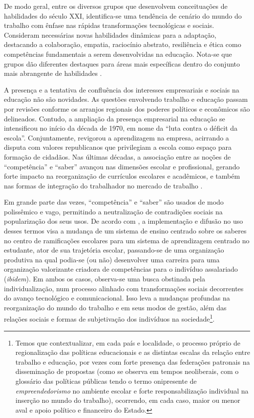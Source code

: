 \documentclass[portuguese]{textolivre}
\begin{document}
De modo geral, entre os diversos grupos que desenvolvem conceituações de
habilidades do século XXI, identifica-se uma tendência de cenário do
mundo do trabalho com ênfase nas rápidas transformações tecnológicas e
sociais. Consideram necessárias novas habilidades dinâmicas para a
adaptação, destacando a colaboração, empatia, raciocínio abstrato,
resiliência e ética como competências fundamentais a serem desenvolvidas
na educação. Nota-se que grupos dão diferentes destaques para áreas mais
específicas dentro do conjunto mais abrangente de habilidades
\cite{Dede2009}.

A presença e a tentativa de confluência dos interesses empresariais e
sociais na educação não são novidades. As questões envolvendo trabalho e
educação passam por revisões conforme os arranjos regionais dos poderes
políticos e econômicos são delineados. Contudo, a ampliação da presença
empresarial na educação se intensificou no início da década de 1970, em
nome da ``luta contra o déficit da escola''. Conjuntamente, revigorou a
aprendizagem na empresa, acirrando a disputa com valores republicanos
que privilegiam a escola como espaço para formação de cidadãos. Nas
últimas décadas, a associação entre as noções de ``competência'' e
``saber'' avançou nas dimensões escolar e profissional, gerando forte
impacto na reorganização de currículos escolares e acadêmicos, e também
nas formas de integração do trabalhador no mercado de trabalho
\cite{Segnini2023}.

Em grande parte das vezes, ``competência'' e ``saber'' são usados de
modo polissêmico e vago, permitindo a neutralização de contradições
sociais na popularização dos seus usos. De acordo com \textcite{Rope1997}, a implementação e difusão no uso desses termos visa a mudança de
um sistema de ensino centrado sobre os saberes no centro de ramificações
escolares para um sistema de aprendizagem centrado no estudante, ator de
sua trajetória escolar, passando-se de uma organização produtiva na qual
podia-se (ou não) desenvolver uma carreira para uma organização
valorizante criadora de competências para o indivíduo assalariado
(\emph{ibidem}). Em ambos os casos, observa-se uma busca obstinada pela
individualização, num processo alinhado com transformações sociais
decorrentes do avanço tecnológico e comunicacional. Isso leva a mudanças
profundas na reorganização do mundo do trabalho e em seus modos de
gestão, além das relações sociais e formas de subjetivação dos
indivíduos na sociedade\footnote{Temos que
  contextualizar, em cada país e localidade, o processo próprio de
  regionalização das políticas educacionais e as distintas escalas da
  relação entre trabalho e educação, por vezes com forte presença das
  federações patronais na disseminação de propostas (como se observa em
  tempos neoliberais, com o glossário das políticas públicas tendo o
  termo onipresente de \emph{empreendedorismo} no ambiente escolar e
  forte responsabilização individual na inserção no mundo do trabalho),
  ocorrendo, em cada caso, maior ou menor aval e apoio político e
  financeiro do Estado.}.
\end{document}
